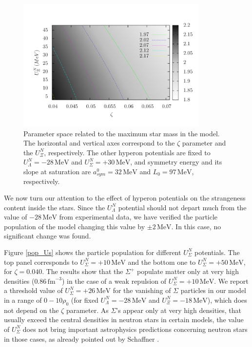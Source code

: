\documentclass[twocolumn,showpacs,aps]{revtex4}
\begin{document}
 \begin{figure}
 \centering
 \vspace{1.0cm}
 \includegraphics[width=9.5cm]{map_Uc_lambda_Mmax.png}
 \caption{\label{space_Uc_lambda} Parameter space related to the maximum star mass in the model. The horizontal and vertical axes
correspond to the $\zeta$ parameter and the $U_{\Xi}^N$, respectively. 
The other hyperon potentials are fixed to $U_{\Lambda}^N=-28 \,\mathrm{MeV}$ and $U_{\Sigma}^N=+30\,\mathrm{MeV} $, 
 and symmetry energy and its slope at saturation are $a_{sym}^0= 32 \,\mathrm{MeV}$ and $L_0=97\,\mathrm{MeV}$, respectively.}
 \end{figure}

  
We now turn our attention to the effect of hyperon potentials on the strangeness content inside the stars.
Since the $U_{\Lambda}^N$ potential should not depart much from the value of $- 28\, \mathrm{MeV}$ from experimental data, 
we have verified the particle population of the model changing this value by $\pm 2\, \mathrm{MeV}$.
In this case, no significant change was found.

Figure \ref{pop_Us} shows the particle population for different $U_{\Sigma}^N$ potentials. 
The top panel corresponds to $U_{\Sigma}^N=+10\, \mathrm{MeV}$
  and the bottom one to $U_{\Sigma}^N=+50\, \mathrm{MeV}$, for $\zeta=0.040$.
The results show that the $\Sigma^+$ populate matter only at very high densities ($0.86\,\mathrm{fm}^{-3}$) in the 
case of a weak repulsion of $U_{\Sigma}^N=+10\, \mathrm{MeV}$. 
We report a threshold value of $U_{\Sigma}^N=+26\, \mathrm{MeV}$ for the vanishing of $\Sigma$ particles in our model
in a range of $0-10\rho_0$ (for fixed $U_{\Lambda}^N=-28\, \mathrm{MeV}$ and $U_{\Xi}^N=-18\, \mathrm{MeV}$), which does not depend on the $\zeta$ parameter. 
As $\Sigma$'s appear only at very high densities, that usually exceed 
the central densities in neutron stars in certain models, the value of $U_{\Sigma}^N$ does not bring important astrophysics predictions
concerning neutron stars in those cases, as already pointed out by Schaffner \cite{SchaffnerBielich:2008kb}.
  
\end{document}
